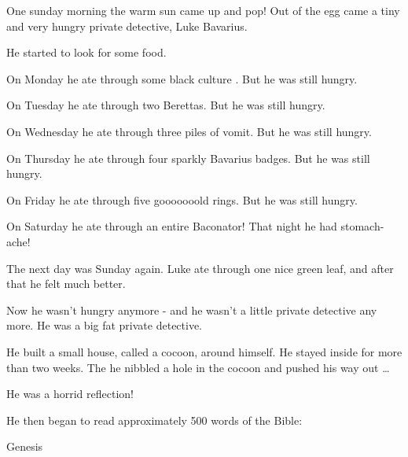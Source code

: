 One sunday morning the warm sun came up and pop! Out of the egg
came a tiny and very hungry private detective, Luke Bavarius.



He started to look for some food.



On Monday he ate through some black culture . But he was still
hungry.



On Tuesday he ate through two Berettas. But he was still
hungry.



On Wednesday he ate through three piles of vomit. But he was still
hungry.



On Thursday he ate through four sparkly Bavarius badges. But he was
still hungry.



On Friday he ate through five gooooooold rings. But he was still
hungry.



On Saturday he ate through an entire Baconator! That night he had
stomach-ache!



The next day was Sunday again. Luke ate through one nice green
leaf, and after that he felt much better.



Now he wasn't hungry anymore - and he wasn't a little private
detective any more. He was a big fat private detective.



He built a small house, called a cocoon, around himself. He stayed
inside for more than two weeks. The he nibbled a hole in the cocoon
and pushed his way out {\ldots}



He was a horrid reflection!



He then began to read approximately 500 words of the Bible:



Genesis



